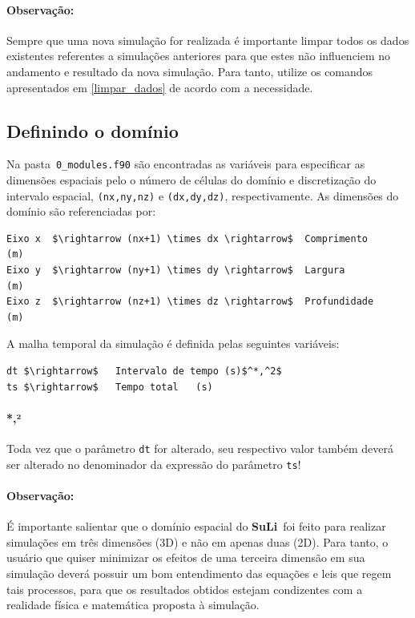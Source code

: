 \documentclass[12pt, a4paper]{article}
\newcommand{\SL}{{\bf SuLi}}
\begin{document}
\paragraph{Observação:} Sempre que uma nova simulação for realizada é importante limpar todos os dados existentes referentes a simulações anteriores para que estes não influenciem no andamento e resultado da nova simulação. Para tanto, utilize os comandos apresentados em \ref{limpar_dados} de acordo com a necessidade.


\subsection{Definindo o domínio}

Na pasta \,\verb|0_modules.f90| são encontradas as variáveis para especificar as dimensões espaciais pelo o número de células do domínio e discretização do intervalo espacial, \verb|(nx,ny,nz)| e \verb|(dx,dy,dz)|, respectivamente. As dimensões do domínio são referenciadas por:
\begin{lstlisting}
Eixo x	$\rightarrow (nx+1) \times dx \rightarrow$  Comprimento		(m)
Eixo y  $\rightarrow (ny+1) \times dy \rightarrow$  Largura			  (m)
Eixo z	$\rightarrow (nz+1) \times dz \rightarrow$  Profundidade	(m)
\end{lstlisting}	\label{eixos}

A malha temporal da simulação é definida pelas seguintes variáveis:
\begin{lstlisting}
dt $\rightarrow$   Intervalo de tempo (s)$^*,^2$
ts $\rightarrow$   Tempo total	 (s)
\end{lstlisting}

\paragraph{*,²} Toda vez que o parâmetro \verb|dt| for alterado, seu respectivo valor também deverá ser alterado no denominador da expressão do parâmetro \verb|ts|!

\paragraph{Observação:} É importante salientar que o domínio espacial do \SL\ foi feito para realizar simulações em três dimensões (3D) e não em apenas duas (2D). Para tanto, o usuário que quiser minimizar os efeitos de uma terceira dimensão em sua simulação deverá possuir um bom entendimento das equações e leis que regem tais processos, para que os resultados obtidos estejam condizentes com a realidade física e matemática proposta à simulação.
\end{document}
